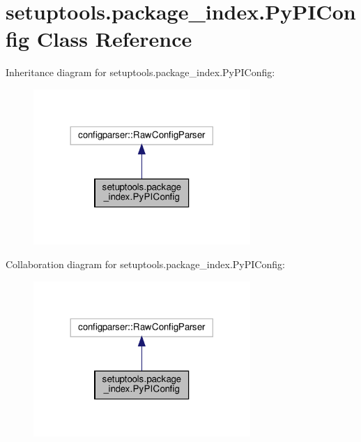 \hypertarget{classsetuptools_1_1package__index_1_1PyPIConfig}{}\section{setuptools.\+package\+\_\+index.\+Py\+P\+I\+Config Class Reference}
\label{classsetuptools_1_1package__index_1_1PyPIConfig}


Inheritance diagram for setuptools.\+package\+\_\+index.\+Py\+P\+I\+Config\+:
\nopagebreak
\begin{figure}[H]
\begin{center}
\leavevmode
\includegraphics[width=233pt]{classsetuptools_1_1package__index_1_1PyPIConfig__inherit__graph}
\end{center}
\end{figure}


Collaboration diagram for setuptools.\+package\+\_\+index.\+Py\+P\+I\+Config\+:
\nopagebreak
\begin{figure}[H]
\begin{center}
\leavevmode
\includegraphics[width=233pt]{classsetuptools_1_1package__index_1_1PyPIConfig__coll__graph}
\end{center}
\end{figure}
